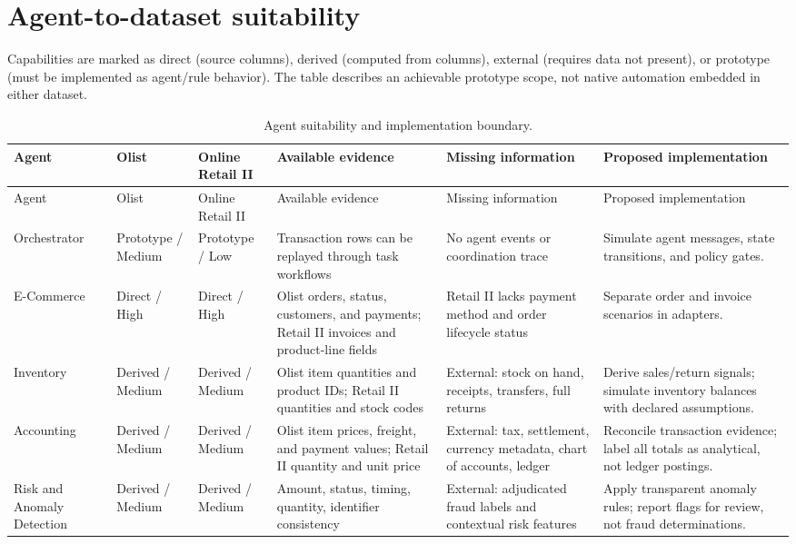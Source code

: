 \documentclass[11pt,a4paper]{article}
\begin{document}
\section{Agent-to-dataset suitability}
Capabilities are marked as direct (source columns), derived (computed from columns), external (requires data not present), or prototype (must be implemented as agent/rule behavior). The table describes an achievable prototype scope, not native automation embedded in either dataset.
\begingroup\small\setlength{\tabcolsep}{3pt}
\begin{longtable}{>{\raggedright\arraybackslash}p{}>{\raggedright\arraybackslash}p{}>{\raggedright\arraybackslash}p{}>{\raggedright\arraybackslash}p{}>{\raggedright\arraybackslash}p{}>{\raggedright\arraybackslash}p{}}
\caption{Agent suitability and implementation boundary.}\label{tab:agents}\\
\toprule Agent & Olist & Online Retail II & Available evidence & Missing information & Proposed implementation\\
\midrule\endfirsthead
\toprule Agent & Olist & Online Retail II & Available evidence & Missing information & Proposed implementation\\
\midrule\endhead
Orchestrator & Prototype / Medium & Prototype / Low & Transaction rows can be replayed through task workflows & No agent events or coordination trace & Simulate agent messages, state transitions, and policy gates.\\
E-Commerce & Direct / High & Direct / High & Olist orders, status, customers, and payments; Retail II invoices and product-line fields & Retail II lacks payment method and order lifecycle status & Separate order and invoice scenarios in adapters.\\
Inventory & Derived / Medium & Derived / Medium & Olist item quantities and product IDs; Retail II quantities and stock codes & External: stock on hand, receipts, transfers, full returns & Derive sales/return signals; simulate inventory balances with declared assumptions.\\
Accounting & Derived / Medium & Derived / Medium & Olist item prices, freight, and payment values; Retail II quantity and unit price & External: tax, settlement, currency metadata, chart of accounts, ledger & Reconcile transaction evidence; label all totals as analytical, not ledger postings.\\
Risk and Anomaly Detection & Derived / Medium & Derived / Medium & Amount, status, timing, quantity, identifier consistency & External: adjudicated fraud labels and contextual risk features & Apply transparent anomaly rules; report flags for review, not fraud determinations.\\

\end{longtable}
\end{document}
